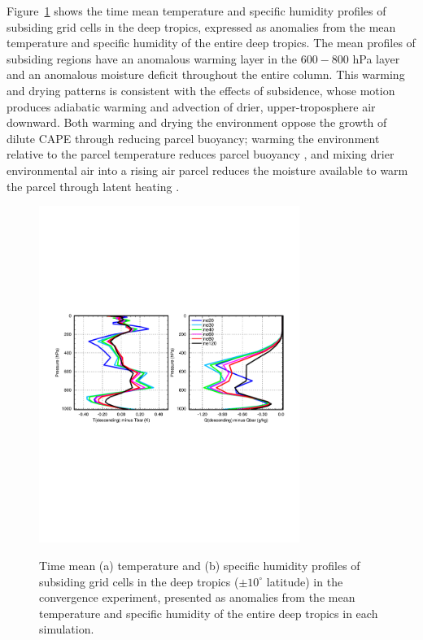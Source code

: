 \documentclass[times]{qjrms4}
\begin{document}
Figure~\ref{fig:profiles} shows the time mean temperature and specific humidity profiles of subsiding grid cells in the deep tropics, expressed as anomalies from the mean temperature and specific humidity of the entire deep tropics. The mean profiles of subsiding regions have an anomalous warming layer in the $600-800$ hPa layer and an anomalous moisture deficit throughout the entire column. This warming and drying patterns is consistent with the effects of subsidence, whose motion produces adiabatic warming and advection of drier, upper-troposphere air downward. Both warming and drying the environment oppose the growth of dilute CAPE through reducing parcel buoyancy; warming the environment relative to the parcel temperature reduces parcel buoyancy \citep{Z2002JGR}, and mixing drier environmental air into a rising air parcel reduces the moisture available to warm the parcel through latent heating \citep{RB1992JAS}. 

\begin{figure}
\begin{center}
\noindent\includegraphics[width=20pc,angle=0]{figs/temp_profiles.pdf}\\
\end{center}
\caption{Time mean (a) temperature and (b) specific humidity profiles of subsiding grid cells in the deep tropics ($\pm 10^{\circ}$ latitude) in the convergence experiment, presented as anomalies from the mean temperature and specific humidity of the entire deep tropics in each simulation.}
\label{fig:profiles}
\end{figure}
\end{document}
